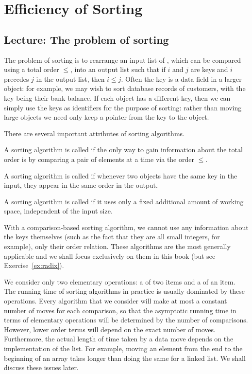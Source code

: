 \part{Efficiency of Sorting}  
\label{ch:effsort}

\chapter{Lecture: The problem of sorting} \label{sec:sortingproblem}
The problem of sorting is to rearrange an input list of , which 
can be compared using a total order $\leq$, into an output list such that if $i$
and $j$ are keys and $i$ precedes $j$ in the output list, then $i\leq j$.
Often the key is a data field in a larger object: for example, we may wish to 
sort database records of customers, with the key being their bank balance. 
If each object has a different key, then we can simply use the keys as identifiers
for the purpose of sorting: rather than moving large objects we need only keep 
a pointer from the key to the object. 

There are several important attributes of sorting algorithms.
\begin{Definition} 
A sorting algorithm is called  if
the only way to gain information about the total order is by comparing a pair 
of elements at a time via the order $\leq$. 

A sorting algorithm is called  if whenever 
two objects have the same 
key in the input, they appear in the same order in the output. 

A sorting algorithm is called  if it uses only a fixed 
additional amount of working space, independent of the input size.
\end{Definition}

With a comparison-based sorting algorithm, we cannot use any 
information about the keys themselves (such as the fact that they are all 
small integers, for example), only their order relation. These algorithms
are the most generally applicable and we shall focus exclusively 
on them in this book (but see Exercise~\ref{ex:radix}). 

We consider only two elementary 
operations: a  of two items 
and a  of an item. The running time of sorting algorithms in practice 
 is usually dominated by these operations. Every algorithm that we consider will make at 
most a constant number of moves for each comparison, so that the asymptotic 
running time in terms of elementary operations will be determined by the 
number of comparisons. However, lower order terms will depend on the exact number
of moves. Furthermore, the actual length of time taken by a data move depends 
on the implementation of the list. For example, moving an element from the 
end to the beginning of an array takes longer than doing the same for a linked 
list. We shall discuss these issues later.

